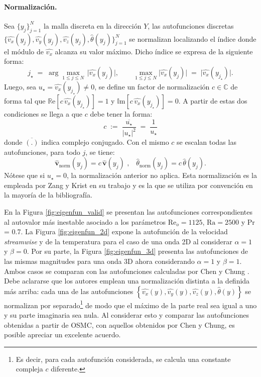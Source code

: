 \paragraph{Normalización.}
Sea $\{y_j\}_{j=1}^{N}$ la malla discreta en la dirección $Y$, las autofunciones \linebreak discretas $\{\widehat{v_x}(y_j),\widehat{v_y}(y_j),\widehat{v_z}(y_j),\widehat{\theta}(y_j)\}_{j=1}^{N}$ se normalizan localizando el índice donde el módulo de $\widehat{v_x}$ alcanza su valor máximo. Dicho índice se expresa de la siguiente forma:
$$
j_\star \;=\; \arg\max_{1\le j\le N}\,\big|\widehat{v_x}(y_j)\big|, 
\qquad 
\max_{1\le j\le N}\big|\widehat{v_x}(y_j)\big| \;=\; \big|\widehat{v_x}(y_{j_\star})\big|.
$$
Luego, sea $u_\star=\widehat{v_x}(y_{j_\star})\neq 0$, se define un factor de normalización $c \in \mathbb{C}$ de forma tal que $\mathbb{R}\text{e}[c \, \widehat{v_x}(y_{j_\star})]=1$ y $\mathbb{I}\text{m}[c \, \widehat{v_x}(y_{j_\star})]=0$. A partir de estas dos condiciones se llega a que $c$ debe tener la forma:
$$
c \;:=\; \frac{\overline{u_\star}}{|u_\star|^2} \;=\; \frac{1}{u_\star}
$$
donde $\overline{(\text{.})}$ indica complejo conjugado. Con el mismo $c$ se escalan todas las autofunciones, para todo $j$, se tiene:
$$
\boldsymbol{\widehat{v}}_{\mathrm{norm}}(y_j)=c\,\boldsymbol{\widehat{v}}(y_j) \text{ ,} \quad
\widehat{\theta}_{\mathrm{norm}}(y_j)=c\,\widehat{\theta}(y_j).
$$
Nótese que si $u_\star=0$, la normalización anterior no aplica. Esta normalización es la empleada por Zang y Krist en su trabajo \cite{zang1989numerical} y es la que se utiliza por convención en la mayoría de la bibliografía.


En la Figura \ref{fig:eigenfun_valid} se presentan las autofunciones correspondientes al autovalor más inestable asociado a los parámetros $\text{Re}_o=1125$, $\text{Ra}=2500$ y Pr = 0.7. La Figura \ref{fig:eigenfun_2d} expone la autofunción de la velocidad \textit{streamwise} y de la temperatura para el caso de una onda 2D al considerar $\alpha=1$ y $\beta=0$. Por su parte, la Figura \ref{fig:eigenfun_3d} presenta las autofunciones de las mismas magnitudes para una onda 3D ahora considerando $\alpha=1$ y $\beta=1$. Ambos casos se comparan con las autofunciones calculadas por Chen y Chung \cite{chen2003direct}. Debe aclararse que los autores emplean una normalización distinta a la definida más arriba: cada una de las autofunciones $\left\lbrace \widehat{v_x}(y), \widehat{v_y}(y), \widehat{v_z}(y), \widehat{\theta}(y) \right\rbrace$ se normalizan por separado\footnote{Es decir, para cada autofunción considerada, se calcula una constante compleja $c$ diferente.} de modo que el máximo de la parte real sea igual a uno y su parte imaginaria sea nula. Al considerar esto y comparar las autofunciones obtenidas a partir de OSMC, con aquellos obtenidos por Chen y Chung, es posible apreciar un excelente acuerdo.

